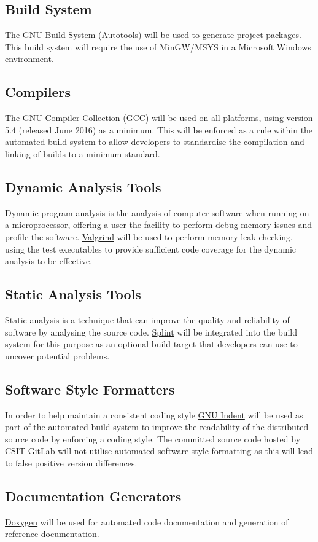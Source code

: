 \subsection{Build System}

The GNU Build System (Autotools) will be used to generate project packages. This build system will require the use of MinGW/MSYS in a Microsoft Windows environment.


\subsection{Compilers}

The GNU Compiler Collection (GCC) will be used on all platforms, using version 5.4 (released June 2016) as a minimum. This will be enforced as a rule within the automated build system to allow developers to standardise the compilation and linking of builds to a minimum standard.


\subsection{Dynamic Analysis Tools}

Dynamic program analysis is the analysis of computer software when running on a microprocessor, offering a user the facility to perform debug memory issues and profile the software. \href{http://valgrind.org/}{Valgrind} will be used to perform memory leak checking, using the test executables to provide sufficient code coverage for the dynamic analysis to be effective.


\subsection{Static Analysis Tools}

Static analysis is a technique that can improve the quality and reliability of software by analysing the source code. \href{http://www.splint.org/}{Splint} will be integrated into the build system for this purpose as an optional build target that developers can use to uncover potential problems.


\subsection{Software Style Formatters}

In order to help maintain a consistent coding style \href{https://www.gnu.org/software/indent/}{GNU Indent} will be used as part of the automated build system to improve the readability of the distributed source code by enforcing a coding style. The committed source code hosted by CSIT GitLab will not utilise automated software style formatting as this will lead to false positive version differences.


\subsection{Documentation Generators}

\href{http://www.doxygen.org/}{Doxygen} will be used for automated code documentation and generation of reference documentation.
